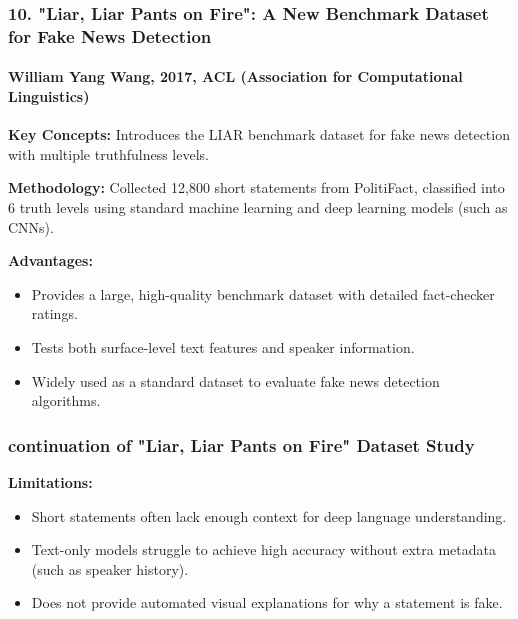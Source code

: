 \documentclass{beamer}
\begin{document}
\begin{frame}
\frametitle{10. "Liar, Liar Pants on Fire": A New Benchmark Dataset for Fake News Detection}
\framesubtitle{William Yang Wang, 2017, ACL (Association for Computational Linguistics)}
\small{
\textbf{Key Concepts:} Introduces the LIAR benchmark dataset for fake news detection with multiple truthfulness levels. \par\vspace{0.15cm}
\textbf{Methodology:} Collected 12,800 short statements from PolitiFact, classified into 6 truth levels using standard machine learning and deep learning models (such as CNNs). \par\vspace{0.15cm}
\textbf{Advantages:}
\begin{itemize}
    \item Provides a large, high-quality benchmark dataset with detailed fact-checker ratings.
    \item Tests both surface-level text features and speaker information.
    \item Widely used as a standard dataset to evaluate fake news detection algorithms.
\end{itemize}
}
\end{frame}

\begin{frame}
\frametitle{continuation of "Liar, Liar Pants on Fire" Dataset Study}
\large{
\textbf{Limitations:}
\begin{itemize}
    \item Short statements often lack enough context for deep language understanding.
    \item Text-only models struggle to achieve high accuracy without extra metadata (such as speaker history).
    \item Does not provide automated visual explanations for why a statement is fake.
\end{itemize}
}
\end{frame}

\end{document}
